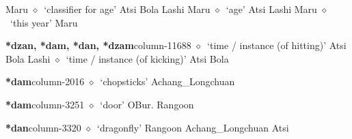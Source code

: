\hspace{1ex}
         Maru 
\hspace{1ex}
         $\diamond$~`classifier for age'
         Atsi 
\hspace{1ex}
         Bola 
\hspace{1ex}
         Lashi 
\hspace{1ex}
         Maru 
\hspace{1ex}
         $\diamond$~`age'
         Atsi 
\hspace{1ex}
         Lashi 
\hspace{1ex}
         Maru 
\hspace{1ex}
         $\diamond$~`this year'
         Maru 
  \item {\footnotesize \textbf{*dzan, *dam, *dan, *dzam}}{\tiny column-11688}
         $\diamond$~`time / instance (of hitting)'
         Atsi 
\hspace{1ex}
         Bola 
\hspace{1ex}
         Lashi 
\hspace{1ex}
         $\diamond$~`time / instance (of kicking)'
         Atsi 
\hspace{1ex}
         Bola 
  \item {\footnotesize \textbf{*dam}}{\tiny column-2016}
         $\diamond$~`chopsticks'
         Achang\_Longchuan 
  \item {\footnotesize \textbf{*dam}}{\tiny column-3251}
         $\diamond$~`door'
         OBur. 
\hspace{1ex}
         Rangoon 
  \item {\footnotesize \textbf{*dan}}{\tiny column-3320}
         $\diamond$~`dragonfly'
         Rangoon 
\hspace{1ex}
         Achang\_Longchuan 
\hspace{1ex}
         Atsi 
\hspace{1ex}
